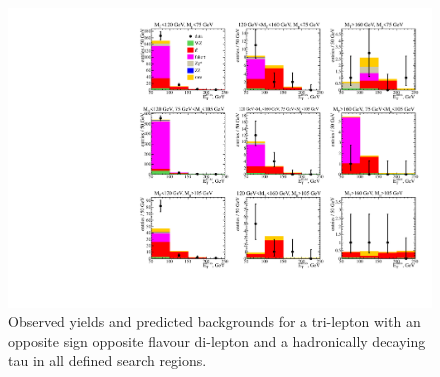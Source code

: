 \begin{figure}[htp]
\begin{center}
\includegraphics[width=1.0\textwidth]{plots/osof1tau1.pdf}
\caption{Observed yields and predicted backgrounds for a tri-lepton with an opposite sign opposite flavour di-lepton and a hadronically decaying tau  in all defined search regions.}
\label{fig:OSOF1tau1}
\end{center}
\end{figure}

